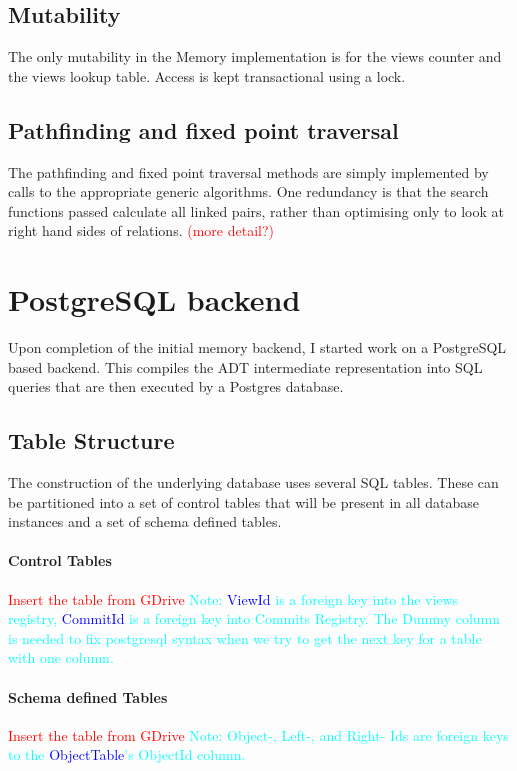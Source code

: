 \documentclass[12pt,a4paper,twoside,openright]{report}
\newcommand\todo[1]{\textcolor{red}{#1}}
\newcommand\codeName[1]{\textcolor{blue}{#1}}
\newcommand\note[1]{\textcolor{cyan}{#1}}
\begin{document}
	\subsection{Mutability}
	The only mutability in the Memory implementation is for the views counter and the views lookup table. Access is kept transactional using a lock.

	\subsection{Pathfinding and fixed point traversal}
	The pathfinding and fixed point traversal methods are simply implemented by calls to the appropriate generic algorithms. One redundancy is that the search functions passed calculate all linked pairs, rather than optimising only to look at right hand sides of relations. \todo{(more detail?)}


\section{PostgreSQL backend}
Upon completion of the initial memory backend, I started work on a PostgreSQL based backend. This compiles the ADT intermediate representation into SQL queries that are then executed by a Postgres database.

	\subsection{Table Structure}
	The construction of the underlying database uses several SQL tables. These can be partitioned into a set of control tables that will be present in all database instances and a set  of schema defined tables.

		\paragraph{Control Tables}
		\todo{Insert the table from GDrive}
\note{Note: \codeName{ViewId} is a foreign key into the views registry, \codeName{CommitId} is a foreign key into Commits Registry. The Dummy column is needed to fix postgresql syntax when we try to get the next key for a table with one column.}		
		
		\paragraph{Schema defined Tables}
		\todo{Insert the table from GDrive}
		\note{Note: Object-, Left-, and Right- Ids are foreign keys to the \codeName{ObjectTable}’s ObjectId column.}
\end{document}
